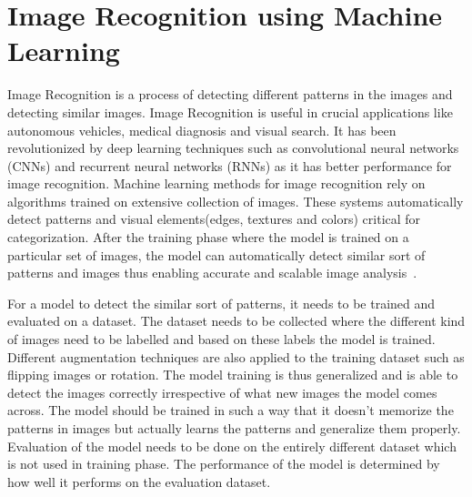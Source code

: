 \section{Image Recognition using Machine Learning}
Image Recognition is a process of detecting different patterns in the images and detecting similar images. Image Recognition is useful in crucial applications like autonomous vehicles, medical diagnosis and visual search. It has been revolutionized by deep learning techniques such as convolutional neural networks (CNNs) and recurrent neural networks (RNNs) as it has better performance for image recognition. Machine learning methods for image recognition rely on algorithms trained on extensive collection of images. These systems automatically detect patterns and visual elements(edges, textures and colors) critical for categorization. After the training phase where the model is trained on a particular set of images, the model can automatically detect similar sort of patterns and images thus enabling accurate and scalable image analysis~\cite{chandni}. 

For a model to detect the similar sort of patterns, it needs to be trained and evaluated on a dataset. The dataset needs to be collected where the different kind of images need to be labelled and based on these labels the model is trained. Different augmentation techniques are also applied to the training dataset such as flipping images or rotation. The model training is thus generalized and is able to detect the images correctly irrespective of what new images the model comes across. The model should be trained in such a way that it doesn't memorize the patterns in images but actually learns the patterns and generalize them properly. Evaluation of the model needs to be done on the entirely different dataset which is not used in training phase. The performance of the model is determined by how well it performs on the evaluation dataset.

